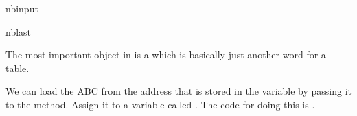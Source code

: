 \documentclass[letterpaper,10pt,english]{sphinxmanual}
\begin{document}
\begin{sphinxuseclass}{nbinput}
\begin{sphinxuseclass}{nblast}
{
\begin{sphinxVerbatim}[commandchars=\\\{\}]
\llap{\color{nbsphinxin}[2]:\,\hspace{\fboxrule}\hspace{\fboxsep}}  
\end{sphinxVerbatim}
}

\end{sphinxuseclass}
\end{sphinxuseclass}
\sphinxAtStartPar
The most important object in  is a  which is basically just another word for a table.

\sphinxAtStartPar
We can load the ABC from the address that is stored in the variable  by passing it to the  method. Assign it to a variable called . The code for doing this is .
\end{document}
